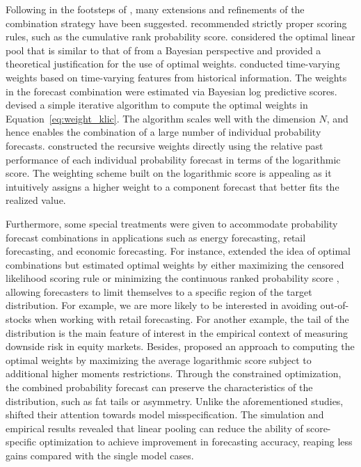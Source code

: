 \documentclass[11pt]{article}
\begin{document}
Following in the footsteps of \citet{Hall2007-lh}, many extensions and refinements of the combination strategy have been suggested. \citet{Gneiting2007-ij} recommended strictly proper scoring rules, such as the cumulative rank probability score. \citet{Geweke2011-xk} considered the optimal linear pool that is similar to that of \citet{Hall2007-lh} from a Bayesian perspective and provided a theoretical justification for the use of optimal weights. \citet{Li2021-gk} conducted time-varying weights based on time-varying features from historical information. The weights in the forecast combination were estimated via Bayesian log predictive scores. \citet{Conflitti2015-fq} devised a simple iterative algorithm to compute the optimal weights in Equation~\eqref{eq:weight_klic}. The algorithm scales well with the dimension $N$, and hence enables the combination of a large number of individual probability forecasts. \citet{Jore2010-yi} constructed the recursive weights directly using the relative past performance of each individual probability forecast in terms of the logarithmic score. The weighting scheme built on the logarithmic score is appealing as it intuitively assigns a higher weight to a component forecast that better fits the realized value.

Furthermore, some special treatments were given to accommodate probability forecast combinations in applications such as energy forecasting, retail forecasting, and economic forecasting. For instance, \citet{Opschoor2017-yu} extended the idea of optimal combinations but estimated optimal weights by either maximizing the censored likelihood scoring rule \citep{Diks2011-gj} or minimizing the continuous ranked probability score \citep{Gneiting2014-tz}, allowing forecasters to limit themselves to a specific region of the target distribution. For example, we are more likely to be interested in avoiding out-of-stocks when working with retail forecasting. For another example, the tail of the distribution is the main feature of interest in the empirical context of measuring downside risk in equity markets. Besides, \citet{Pauwels2020-zl} proposed an approach to computing the optimal weights by maximizing the average logarithmic score subject to additional higher moments restrictions. Through the constrained optimization, the combined probability forecast can preserve the characteristics of the distribution, such as fat tails or asymmetry. Unlike the aforementioned studies, \citet{Martin2021-yi} shifted their attention towards model misspecification. The simulation and empirical results revealed that linear pooling can reduce the ability of score-specific optimization to achieve improvement in forecasting accuracy, reaping less gains compared with the single model cases.
\end{document}
